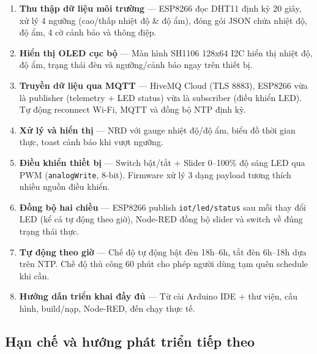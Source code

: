 \documentclass[13pt,a4paper]{article}
\newcommand{\code}[1]{\texttt{#1}}
\begin{document}
\begin{enumerate}[label=\arabic*., leftmargin=1.5cm]
    \item \textbf{Thu thập dữ liệu môi trường} --- ESP8266 đọc DHT11 định kỳ 20 giây, xử lý 4 ngưỡng (cao/thấp nhiệt độ \& độ ẩm), đóng gói JSON chứa nhiệt độ, độ ẩm, 4 cờ cảnh báo và thông điệp.
    \item \textbf{Hiển thị OLED cục bộ} --- Màn hình SH1106 128x64 I2C hiển thị nhiệt độ, độ ẩm, trạng thái đèn và ngưỡng/cảnh báo ngay trên thiết bị.
    \item \textbf{Truyền dữ liệu qua MQTT} --- HiveMQ Cloud (TLS 8883), ESP8266 vừa là publisher (telemetry + LED status) vừa là subscriber (điều khiển LED). Tự động reconnect Wi-Fi, MQTT và đồng bộ NTP định kỳ.
    \item \textbf{Xử lý và hiển thị} --- NRD với gauge nhiệt độ/độ ẩm, biểu đồ thời gian thực, toast cảnh báo khi vượt ngưỡng.
    \item \textbf{Điều khiển thiết bị} --- Switch bật/tắt + Slider 0--100\% độ sáng LED qua PWM (\code{analogWrite}, 8-bit). Firmware xử lý 3 dạng payload tương thích nhiều nguồn điều khiển.
    \item \textbf{Đồng bộ hai chiều} --- ESP8266 publish \code{iot/led/status} sau mỗi thay đổi LED (kể cả tự động theo giờ), Node-RED đồng bộ slider và switch về đúng trạng thái thực.
    \item \textbf{Tự động theo giờ} --- Chế độ tự động bật đèn 18h--6h, tắt đèn 6h--18h dựa trên NTP. Chế độ thủ công 60 phút cho phép người dùng tạm quên schedule khi cần.
    \item \textbf{Hướng dẫn triển khai đầy đủ} --- Từ cài Arduino IDE + thư viện, cấu hình, build/nạp, Node-RED, đến chạy thực tế.
\end{enumerate}

\subsection{Hạn chế và hướng phát triển tiếp theo}
\label{sec:gioi}
\end{document}
